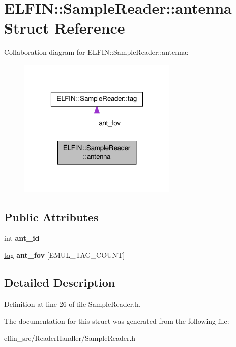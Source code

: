 \hypertarget{struct_e_l_f_i_n_1_1_sample_reader_1_1antenna}{\section{E\-L\-F\-I\-N\-:\-:Sample\-Reader\-:\-:antenna Struct Reference}
\label{struct_e_l_f_i_n_1_1_sample_reader_1_1antenna}
}


Collaboration diagram for E\-L\-F\-I\-N\-:\-:Sample\-Reader\-:\-:antenna\-:
\nopagebreak
\begin{figure}[H]
\begin{center}
\leavevmode
\includegraphics[width=214pt]{struct_e_l_f_i_n_1_1_sample_reader_1_1antenna__coll__graph}
\end{center}
\end{figure}
\subsection*{Public Attributes}
\begin{DoxyCompactItemize}
\item 
\hypertarget{struct_e_l_f_i_n_1_1_sample_reader_1_1antenna_a427c5e78cd9571cbaeedd39b42cb2bf1}{int {\bfseries ant\-\_\-id}}\label{struct_e_l_f_i_n_1_1_sample_reader_1_1antenna_a427c5e78cd9571cbaeedd39b42cb2bf1}

\item 
\hypertarget{struct_e_l_f_i_n_1_1_sample_reader_1_1antenna_ad35528a9cccf1d6937b56399d19903d4}{\hyperlink{struct_e_l_f_i_n_1_1_sample_reader_1_1tag}{tag} {\bfseries ant\-\_\-fov} \mbox{[}E\-M\-U\-L\-\_\-\-T\-A\-G\-\_\-\-C\-O\-U\-N\-T\mbox{]}}\label{struct_e_l_f_i_n_1_1_sample_reader_1_1antenna_ad35528a9cccf1d6937b56399d19903d4}

\end{DoxyCompactItemize}


\subsection{Detailed Description}


Definition at line 26 of file Sample\-Reader.\-h.



The documentation for this struct was generated from the following file\-:\begin{DoxyCompactItemize}
\item 
elfin\-\_\-src/\-Reader\-Handler/Sample\-Reader.\-h\end{DoxyCompactItemize}
